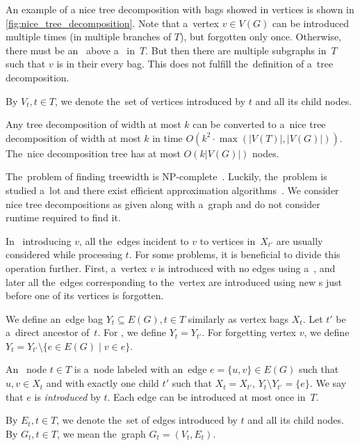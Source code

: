 An example of a nice tree decomposition with bags showed in vertices
is shown in \cref{fig:nice_tree_decomposition}.
%
Note that a~vertex \( v \in V(G) \) can be introduced multiple times
(in multiple branches of \( T \)),
but forgotten only once.
%
Otherwise, there must be an~\IntroduceVertexNode{} above a~\ForgetVertexNode{} in~\( T \).
But then there are multiple subgraphs in~\( T \)
such that \( v \) is in their every bag.
This does not fulfill the~definition of a~tree decomposition.

By \( V_t, t \in T \), we denote the~set of vertices introduced by \( t \)
and all its child nodes.
%
\begin{lemma}
	Any tree decomposition of width at most \( k \) can be converted to
	a~nice tree decomposition of width at most \( k \)
	in time \( O(k^2 \cdot \max(|V(T)|, |V(G)|)) \).
	The~nice decomposition tree has at most \( O(k|V(G)|) \) nodes.
\end{lemma}

The~problem of finding treewidth is NP-complete~\cite{tree_width_np_complete}.
Luckily, the~problem is studied a~lot and
there exist efficient approximation algorithms~\cite{tree_width_approximation}.
We consider nice tree decompositions as given along with a~graph
and do not consider runtime required to find it.

In~\IntroduceVertexNode{} introducing \( v \), all the~edges incident to \( v \)
to vertices in~\( X_{t'} \) are usually considered while processing \( t \).
%
For some problems, it is beneficial to divide this operation further.
First, a~vertex \( v \) is introduced with no edges using a~\IntroduceVertexNode{},
and later all the~edges corresponding to the~vertex are introduced using new \IntroduceEdgeNode{}s
just before one of its vertices is forgotten.

We define an~edge bag \( Y_t \subseteq E(G), t \in T \) similarly as vertex bags \( X_t \).
%
Let \( t' \) be a~direct ancestor of~\( t \).
For \IntroduceVertexNode{}, we define \( Y_t = Y_{t'} \).
For \ForgetVertexNode{} forgetting vertex \( v \),
we define \( Y_t = Y_{t'} \setminus \{ e \in E(G) \mid v \in e\} \).
%
\begin{definition}
	An~\IntroduceEdgeNode{} node \( t \in T \) is a~node
	labeled with an~edge \( e = \{u, v\} \in E(G) \)
	such that \( u, v \in X_t \) and with exactly one child \( t' \)
	such that \( X_t = X_{t'} \), \( Y_t \setminus Y_{t'} = \{e\} \).
	We say that \( e \) is \emph{introduced} by \( t \).
	Each edge can be introduced at most once in~\( T \).
\end{definition}
%
By \( E_t, t \in T \), we denote the~set of edges introduced by \( t \)
and all its child nodes.
By \( G_t, t \in T \), we mean the~graph \( G_t = (V_t, E_t) \).

